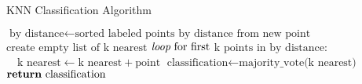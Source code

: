 \def\BState{\State\hskip-\ALG@thistlm}
\begin{algorithm}
\caption{KNN Classification Algorithm}\label{euclid}
\begin{algorithmic}[1]
\State $\text{by distance}\gets\text{sorted labeled points by distance from new point}$
\State $\text{create empty list of k nearest}$
\State $\emph{loop} \text{ for first }$k$\text{ points in by distance:}$ %
\State $\enspace\enspace\text{k nearest}\gets\text{k nearest}+\text{point}$
\State $\text{classification}\gets\text{majority\_vote(k nearest)}$
\State $\Return \text{ classification}$
\EndProcedure
\end{algorithmic}
\end{algorithm}